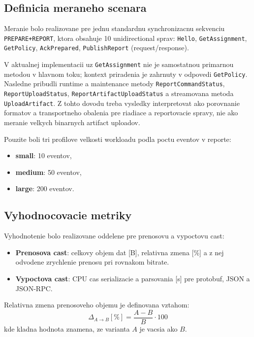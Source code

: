 \documentclass[12pt,a4paper]{report}
\begin{document}
\subsection{Definicia meraneho scenara}

Meranie bolo realizovane pre jednu standardnu synchronizacnu sekvenciu
\texttt{PREPARE+REPORT}, ktora obsahuje 10 unidirectional sprav:
\texttt{Hello}, \texttt{GetAssignment}, \texttt{GetPolicy},
\texttt{AckPrepared}, \texttt{PublishReport} (request/response).

V aktualnej implementacii uz \texttt{GetAssignment} nie je samostatnou
primarnou metodou v hlavnom toku; kontext priradenia je zahrnuty v odpovedi
\texttt{GetPolicy}. Nasledne pribudli runtime a maintenance metody
\texttt{ReportCommandStatus}, \texttt{ReportUploadStatus},
\texttt{ReportArtifactUploadStatus} a streamovana metoda
\texttt{UploadArtifact}. Z tohto dovodu treba vysledky interpretovat ako
porovnanie formatov a transportneho obalenia pre riadiace a reportovacie
spravy, nie ako meranie velkych binarnych artifact uploadov.

Pouzite boli tri profilove velkosti workloadu podla poctu eventov v reporte:
\begin{itemize}
  \item \textbf{small}: 10 eventov,
  \item \textbf{medium}: 50 eventov,
  \item \textbf{large}: 200 eventov.
\end{itemize}

\subsection{Vyhodnocovacie metriky}

Vyhodnotenie bolo realizovane oddelene pre prenosovu a vypoctovu cast:
\begin{itemize}
  \item \textbf{Prenosova cast}: celkovy objem dat [B], relativna zmena [\%] a
  z nej odvodene zrychlenie prenosu pri rovnakom bitrate.
  \item \textbf{Vypoctova cast}: CPU cas serializacie a parsovania [s]
  pre protobuf, JSON a JSON-RPC.
\end{itemize}

Relativna zmena prenosoveho objemu je definovana vztahom:
\begin{equation}
\Delta_{A \rightarrow B} [\%] = \frac{A - B}{B} \cdot 100
\end{equation}
kde kladna hodnota znamena, ze varianta $A$ je vacsia ako $B$.
\end{document}
